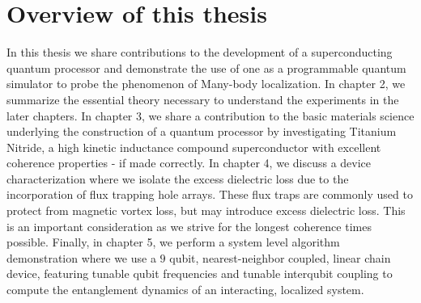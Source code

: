 \section{Overview of this thesis}
In this thesis we share contributions to the development of a superconducting quantum processor
and demonstrate the use of one as a programmable quantum simulator to probe the phenomenon of Many-body localization.
In chapter 2, we summarize the essential theory necessary to understand the experiments in the later chapters.
In chapter 3, we share a contribution to the basic materials science underlying the construction of a quantum processor by investigating Titanium Nitride,
a high kinetic inductance compound superconductor with excellent coherence properties - if made correctly.
In chapter 4, we discuss a device characterization where we isolate the excess dielectric loss due to the incorporation of flux trapping hole arrays.
These flux traps are commonly used to protect from magnetic vortex loss, but may introduce excess dielectric loss.
This is an important consideration as we strive for the longest coherence times possible.
Finally, in chapter 5, we perform a system level algorithm demonstration where we use a $9$ qubit, nearest-neighbor coupled,
linear chain device, featuring tunable qubit frequencies and tunable interqubit coupling to compute the entanglement dynamics of an interacting, localized system.
